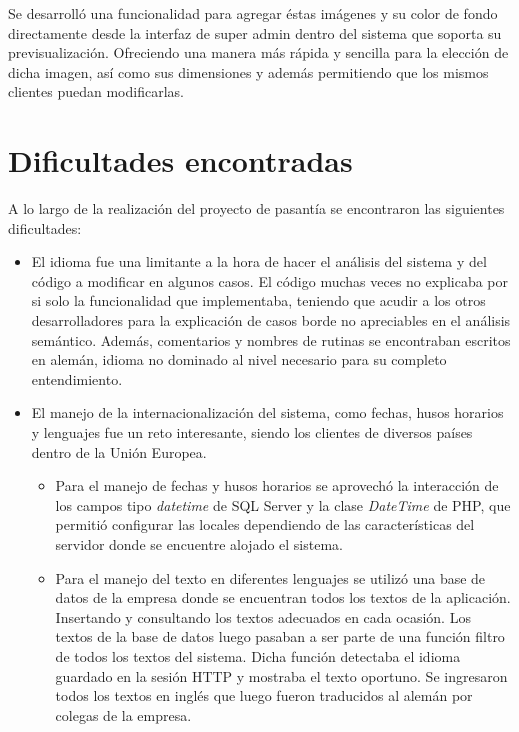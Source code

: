 	Se desarrolló una funcionalidad para agregar éstas imágenes y su color de fondo directamente desde la interfaz de super admin dentro del sistema que soporta su previsualización. Ofreciendo una manera más rápida y sencilla para la elección de dicha imagen, así como sus dimensiones y además permitiendo que los mismos clientes puedan modificarlas. 


\section{Dificultades encontradas} %
\label{sec:dificultades_encontradas}

A lo largo de la realización del proyecto de pasantía se encontraron las siguientes dificultades:

\begin{itemize}
	\item El idioma fue una limitante a la hora de hacer el análisis del sistema y del código a modificar en algunos casos. El código muchas veces no explicaba por si solo la funcionalidad que implementaba, teniendo que acudir a los otros desarrolladores para la explicación de casos borde no apreciables en el análisis semántico. Además, comentarios y nombres de rutinas se encontraban escritos en alemán, idioma no dominado al nivel necesario para su completo entendimiento.

	\item El manejo de la internacionalización del sistema, como fechas, husos horarios y lenguajes fue un reto interesante, siendo los clientes de diversos países dentro de la Unión Europea. 
	
	\begin{itemize}
		\item Para el manejo de fechas y husos horarios se aprovechó la interacción de los campos tipo \emph{datetime} de SQL Server y la clase \emph{DateTime} de PHP, que permitió configurar las locales dependiendo de las características del servidor donde se encuentre alojado el sistema.

		\item Para el manejo del texto en diferentes lenguajes se utilizó una base de datos de la empresa donde se encuentran todos los textos de la aplicación. Insertando y consultando los textos adecuados en cada ocasión. Los textos de la base de datos luego pasaban a ser parte de una función filtro de todos los textos del sistema. Dicha función detectaba el idioma guardado en la sesión \gls{HTTP} y mostraba el texto oportuno. Se ingresaron todos los textos en inglés que luego fueron traducidos al alemán por colegas de la empresa.
	\end{itemize}

\end{itemize}




